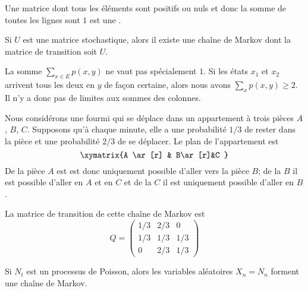 \begin{definition}
    Une matrice dont tous les éléments sont positifs ou nuls et donc la somme de toutes les lignes sont \( 1\) est une .
\end{definition}

\begin{lemma}
    Si \( U\) est une matrice stochastique, alors il existe une chaîne de Markov dont la matrice de transition soit \( U\).
\end{lemma}

\begin{remark}
    La somme \( \sum_{x\in E}p(x,y)\) ne vaut pas spécialement \( 1\). Si les états \( x_1\) et \( x_2\) arrivent tous les deux en \( y\) de façon certaine, alors nous avons \( \sum_xp(x,y)\geq 2\). Il n'y a donc pas de limites aux sommes des colonnes.
\end{remark}

\begin{example}
    Nous considérons une fourmi qui se déplace dans un appartement à trois pièces \( A\), \( B\), \( C\). Supposons qu'à chaque minute, elle a une probabilité \( 1/3\) de rester dans la pièce et une probabilité \( 2/3\) de se déplacer. Le plan de l'appartement est
    \begin{equation}
        \xymatrix{%
        A \ar[r]      &  B\ar[r]&C
           }
    \end{equation}
    De la pièce \( A\) est est donc uniquement possible d'aller vers la pièce \( B\); de la \( B\) il est possible d'aller en \( A\) et en \( C\) et de la \( C\) il est uniquement possible d'aller en \( B\).

    La matrice de transition de cette chaîne de Markov est 
    \begin{equation}
        Q=\begin{pmatrix}
            1/3    &   2/3    &   0    \\
            1/3    &   1/3    &   1/3    \\
            0    &   2/3    &   1/3
        \end{pmatrix}
    \end{equation}
\end{example}

\begin{example}
    Si \( N_t\) est un processus de Poisson, alors les variables aléatoires \( X_n=N_n\) forment une chaîne de Markov.
\end{example}

